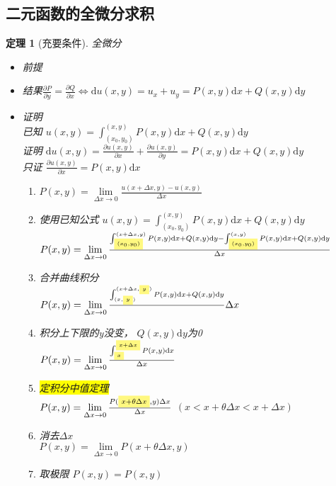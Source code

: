 \documentclass[UTF8,a4paper,12pt,scheme=chinese]{ctexbook}
\newcommand{\ud}{\mathrm{d}}
\newcommand{\hl}[1]{\colorbox{yellow}{#1}}
\newcommand{\hlb}[1]{%
	\colorbox{yellow!50}{$\scriptstyle#1$}}
\newcommand{\hlc}[1]{%
	\colorbox{yellow!50}{$\scriptscriptstyle#1$}}
\newtheorem{theorem}{定理}[section]
\theoremstyle{plain}
\begin{document}
	\subsection{二元函数的全微分求积} 
	\begin{theorem}[充要条件]
		全微分
		\begin{itemize}
			\item 前提
			\item 结果\quad $\frac{{\partial P}}{{\partial y}} = \frac{{\partial Q}}{{\partial x}}\Leftrightarrow\ud u(x,y)=u_x + u_y=P(x,y)\ud x + Q(x,y) \ud y$
			\item 证明\\
			已知 $
			u(x,y)
			=
			\int_{(x_{0},y_{0})}^{(x,y)}P(x,y)\ud x + Q(x,y) \ud y
			$
			\\
			证明
			$
			\ud u(x,y)
			=
			\frac{\partial u(x,y)}{\partial x} + \frac{\partial u(x,y)}{\partial y}
			=
			P(x,y)\ud x + Q(x,y) \ud y
			$\\
			只证
			$
			\frac{\partial u(x,y)}{\partial x}
			=
			P(x,y)\ud x
			$
			\begin{enumerate}
				
				\item 
				$
				P(x,y) =
				\lim\limits_{\Delta x \rightarrow 0}\frac{u(x+\Delta x,y)-u(x,y)}{\Delta x}
				$
				\item 使用已知公式 $
				u(x,y)
				=
				\int_{(x_{0},y_{0})}^{(x,y)}P(x,y)\ud x + Q(x,y) \ud y
				$\\
				$
				P(x,y) =
				\lim\limits_{\Delta x \rightarrow 0}\frac{
					\int_{\hlc{(x_{0},y_{0})}}^{(x+\Delta x,y)}P(x,y)\ud x+ Q(x,y)\ud y
					-
					\int_{\hlc{(x_{0},y_{0})}}^{(x,y)}P(x,y)\ud x+ Q(x,y)\ud y
				}
				{\Delta x}
				$
				\item 合并曲线积分\\
				$
				P(x,y) =
				\lim\limits_{\Delta x \rightarrow 0}\frac{
					\int_{(x,\hlc{y})}^{(x+\Delta x,\hlc{y})}P(x,y)\ud x+ Q(x,y)\ud y
				}\displaystyle
				{\Delta x}
				$
				\item 积分上下限的y没变， $Q(x,y)\ud y$为0\\
				$
				P(x,y) =
				\lim\limits_{\Delta x \rightarrow 0}\frac{
					\int_{\hlc{x}}^{\hlc{x+\Delta x}}P(x,y)\ud x
				}
				{\Delta x}
				$
				\item \hl{定积分中值定理}\\
				$
				P(x,y) =
				\lim\limits_{\Delta x \rightarrow 0}\frac{
					P(
					\hlb{x+\theta \Delta x}
					,y) \Delta x
				}
				{\Delta x}
				$
				$(x<x+\theta \Delta x<x+ \Delta x)$
				\item 消去$\Delta x$\\
				$
				P(x,y) =
				\lim\limits_{\Delta x \rightarrow 0}
				P(x+\theta \Delta x,y)
				$
				\item 取极限
				$
				P(x,y) =
				P(x,y)
				$
			\end{enumerate}
		\end{itemize}
	\end{theorem}
\end{document}
